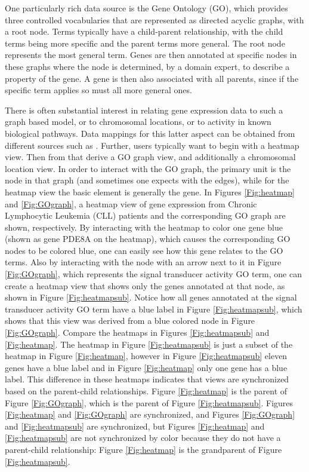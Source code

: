 \documentclass{article}[11pt]
\begin{document}
One particularly rich data source is the Gene Ontology (GO), \cite{GO}
which provides three controlled vocabularies that are represented as
directed acyclic graphs, with a root node.  Terms typically have a
child-parent relationship, with the child terms being more specific
and the parent terms more general.  The root node represents the most
general term.  Genes are then annotated at specific nodes in these
graphs where the node is determined, by a domain expert, to describe a
property of the gene.  A gene is then also associated with all parents,
since if the specific term applies so must all more general ones.

There is often substantial interest in relating gene expression data
to such a graph based model, or to chromosomal locations, or to
activity in known biological pathways. Data mappings for this latter
aspect can be obtained from different sources such as \cite{KEGG}.
Further, users typically want to begin with a heatmap view. Then from
that derive a GO graph view, and additionally a chromosomal location
view. In order to interact with the GO graph, the primary unit is the
node in that graph (and sometimes one expects with the edges), while
for the heatmap view the basic element is generally the gene.  In Figures
\ref{Fig:heatmap} and \ref{Fig:GOgraph}, a heatmap view of gene expression
from Chronic Lymphocytic Leukemia (CLL) patients and the corresponding GO
graph are shown, respectively.  By interacting with the heatmap to color one
gene blue (shown as gene PDE8A on the heatmap), which causes the corresponding
GO nodes to be colored blue, one can easily see how this gene relates to the
GO terms.  Also by interacting with the node with an arrow next to it in
Figure \ref{Fig:GOgraph}, which represents the signal transducer activity GO
term, one can create a heatmap view that shows only the genes annotated at
that node, as shown in Figure \ref{Fig:heatmapsub}.  Notice how all genes
annotated at the signal transducer activity GO term have a blue label in
Figure \ref{Fig:heatmapsub}, which shows that this view was derived from a
blue colored node in Figure \ref{Fig:GOgraph}.  Compare the heatmaps in
Figures \ref{Fig:heatmapsub} and \ref{Fig:heatmap}.  The heatmap in Figure
\ref{Fig:heatmapsub} is just a subset of the heatmap in Figure
\ref{Fig:heatmap}, however in Figure \ref{Fig:heatmapsub} eleven genes have a
blue label and in Figure \ref{Fig:heatmap} only one gene has a blue label.
This difference in these heatmaps indicates that views are synchronized based
on the parent-child relationships.  Figure \ref{Fig:heatmap} is the parent of
Figure \ref{Fig:GOgraph}, which is the parent of Figure \ref{Fig:heatmapsub}.
Figures \ref{Fig:heatmap} and \ref{Fig:GOgraph} are synchronized, and Figures
\ref{Fig:GOgraph} and \ref{Fig:heatmapsub} are synchronized, but Figures
\ref{Fig:heatmap} and \ref{Fig:heatmapsub} are not synchronized by color
because they do not have a parent-child relationship: Figure \ref{Fig:heatmap}
is the grandparent of Figure \ref{Fig:heatmapsub}.
\end{document}
